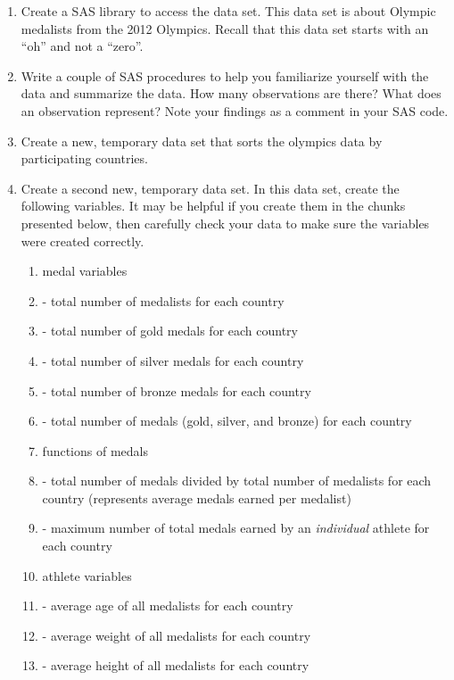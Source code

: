 



\vskip10pt
\vskip10pt
\begin{enumerate}
\item Create a SAS library to access the  data set.  This data set is about Olympic medalists from the 2012 Olympics.  Recall that this data set starts with an ``oh'' and not a ``zero''.
\item Write a couple of SAS procedures to help you familiarize yourself with the data and summarize  the data.  How many observations are there?  What does an observation represent?  Note your findings as a comment in your SAS code.
\item Create a new, temporary data set that sorts the olympics data by participating countries.
\item Create a second new, temporary data set.  In this data set, create the following variables.  It may be helpful if you create them in the chunks presented below, then carefully check your data to make sure the variables were created correctly.
\begin{enumerate}
\item medal variables
\item[]  - total number of medalists for each country
\item[]  - total number of gold medals for each country
\item[]  - total number of silver medals for each country
\item[]  - total number of bronze medals for each country
\item[]  - total number of medals (gold, silver, and bronze) for each country
\item functions of medals
\item[]  - total number of medals divided by total number of medalists for each country (represents average medals earned per medalist)
\item[]  - maximum number of total medals earned by an \emph{individual} athlete for each country
\item athlete variables
\item[]   - average age of all medalists for each country
\item[]   - average weight of all medalists for each country
\item[]  -  average height of all medalists for each country

\end{enumerate}
\end{enumerate}
